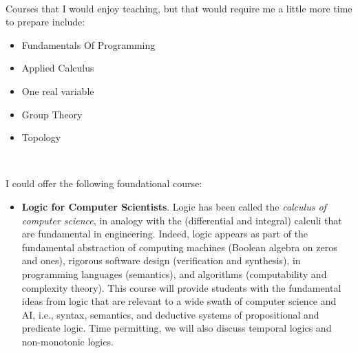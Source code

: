 \documentclass[10,a4paper,sans]{moderncv}
\begin{document}
\

Courses that I would enjoy teaching, but that would require me a little more time to prepare include:
\begin{itemize}
\item Fundamentals Of Programming
 \item Applied Calculus
 \item One real variable
 \item Group Theory
 \item Topology
\end{itemize}

\

I could offer the following foundational course: 
\begin{itemize}
  \item \textbf{Logic for Computer Scientists}. Logic has been called the \emph{calculus of computer science}, in analogy with the (differential and integral) calculi that are fundamental in engineering. Indeed, logic appears as part of the fundamental abstraction of computing machines (Boolean algebra on zeros and ones), rigorous software design (verification and synthesis), in programming languages (semantics), and algorithms (computability and complexity theory). This course will provide students 
  with the fundamental ideas from logic that are relevant to a wide swath of computer science and AI, i.e., syntax, semantics, and deductive systems of propositional and predicate logic. Time permitting, we will also discuss temporal logics and non-monotonic logics.
 \end{itemize}

 \
 
\end{document}
